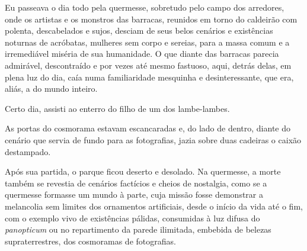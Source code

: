 
Eu passeava o dia todo pela quermesse, sobretudo pelo campo dos arredores,
onde os artistas e os monstros das barracas, reunidos em torno do caldeirão
com polenta, descabelados e sujos, desciam de seus belos cenários e
existências noturnas de acróbatas, mulheres sem corpo e sereias, para a massa
comum e a irremediável miséria de sua humanidade. O que diante das barracas
parecia admirável, descontraído e por vezes até mesmo fastuoso, aqui, detrás
delas, em plena luz do dia, caía numa familiaridade mesquinha e
desinteressante, que era, aliás, a do mundo inteiro.

Certo dia, assisti ao enterro do filho de um dos lambe-lambes.

As portas do cosmorama estavam escancaradas e, do lado de dentro, diante do
cenário que servia de fundo para as fotografias, jazia sobre duas cadeiras o
caixão destampado.






Após sua partida, o parque ficou deserto e desolado. Na quermesse, a morte
também se revestia de cenários factícios e cheios de nostalgia, como se a
quermesse formasse um mundo à parte, cuja missão fosse demonstrar a
melancolia sem limites dos ornamentos artificiais, desde o início da vida até
o fim, com o exemplo vivo de existências pálidas, consumidas à luz difusa
do \textit{panopticum} ou no repartimento da parede ilimitada, embebida de
belezas supraterrestres, dos cosmoramas de fotografias. 


